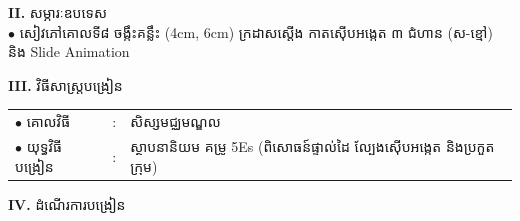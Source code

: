 \documentclass[a4paper,10pt]{article}
\begin{document}
{\vspace{0pt}

\textbf{II.} {\muol សម្ភារៈឧបទេស}\\[1pt]
\hspace*{0.55cm}$\bullet$ \hspace{0.35cm} សៀវភៅគោលទី៨ ចង្កឹះគន្លឹះ (4cm, 6cm) ក្រដាសស្តើង កាតស៊ើបអង្កេត ៣ ជំហាន (ស-ខ្មៅ) និង Slide Animation

\vspace{0pt}

\textbf{III.} {\muol វិធីសាស្រ្តបង្រៀន}\\[1pt]
\hspace*{0.55cm}%
\begin{tabular}{@{}l l l@{}}
  $\bullet$ \hspace{0.35cm} គោលវិធី & : \hspace{0.7cm} & សិស្សមជ្ឈមណ្ឌល \\
  $\bullet$ \hspace{0.35cm} យុទ្ធវិធីបង្រៀន & : & ស្ថាបនានិយម គម្រូ 5Es (ពិសោធន៍ផ្ទាល់ដៃ ល្បែងស៊ើបអង្កេត និងប្រកួតក្រុម) \\
\end{tabular}
}

\vspace{0pt}

\textbf{IV.} {\muol ដំណើរការបង្រៀន}

\vspace{0pt}
\end{document}
